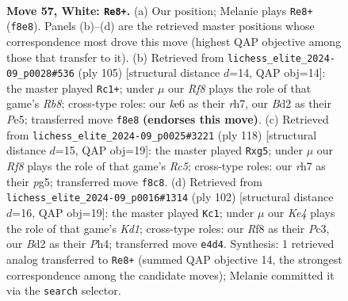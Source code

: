 \documentclass[11pt]{article}
\begin{document}
\clearpage

\begin{figure}[p]\centering
\begin{subfigure}{0.46\textwidth}\centering
\resizebox{\linewidth}{!}{%
\newchessgame
\chessboard[
  setfen={5R2/7r/3Pk3/1p6/4K3/r7/1p1B4/8 w - - 2 57},
  showmover=false,
  pgfstyle=straightmove, color=movearrow, markmove={f8-e8}
]}
\caption{}
\end{subfigure}\hfill
\begin{subfigure}{0.46\textwidth}\centering
\resizebox{\linewidth}{!}{%
\newchessgame
\chessboard[
  setfen={4k3/7R/P1K4p/4p3/8/8/7P/1r6 b - - 3 53},
  showmover=false,
  pgfstyle=straightmove, color=movearrow, markmove={b1-c1}
]}
\caption{}
\end{subfigure}
\\[4pt]
\begin{subfigure}{0.46\textwidth}\centering
\resizebox{\linewidth}{!}{%
\newchessgame
\chessboard[
  setfen={8/8/4p3/2R3p1/4k3/4P3/6K1/1r6 w - - 0 60},
  showmover=false,
  pgfstyle=straightmove, color=movearrow, markmove={c5-g5}
]}
\caption{}
\end{subfigure}\hfill
\begin{subfigure}{0.46\textwidth}\centering
\resizebox{\linewidth}{!}{%
\newchessgame
\chessboard[
  setfen={8/8/8/5p1p/2p2P1P/2P1k3/r7/3K4 w - - 0 52},
  showmover=false,
  pgfstyle=straightmove, color=movearrow, markmove={d1-c1}
]}
\caption{}
\end{subfigure}
\caption{\textbf{Move 57, White: \texttt{Re8+}.} (a) Our position; Melanie plays \texttt{Re8+} (\texttt{f8e8}). Panels (b)--(d) are the retrieved master positions whose correspondence most drove this move (highest QAP objective among those that transfer to it). (b) Retrieved from \texttt{lichess\_elite\_2024-09\_p0028\#536} (ply 105) [structural distance $d$=14, QAP obj=14]: the master played \texttt{Rc1+}; under $\mu$ our \emph{Rf8} plays the role of that game's \emph{Rb8}; cross-type roles: our \emph{k}e6 as their \emph{r}h7, our \emph{B}d2 as their \emph{P}e5; transferred move \texttt{f8e8} \textbf{(endorses this move)}. (c) Retrieved from \texttt{lichess\_elite\_2024-09\_p0025\#3221} (ply 118) [structural distance $d$=15, QAP obj=19]: the master played \texttt{Rxg5}; under $\mu$ our \emph{Rf8} plays the role of that game's \emph{Rc5}; cross-type roles: our \emph{r}h7 as their \emph{p}g5; transferred move \texttt{f8c8}. (d) Retrieved from \texttt{lichess\_elite\_2024-09\_p0016\#1314} (ply 102) [structural distance $d$=16, QAP obj=19]: the master played \texttt{Kc1}; under $\mu$ our \emph{Ke4} plays the role of that game's \emph{Kd1}; cross-type roles: our \emph{R}f8 as their \emph{P}c3, our \emph{B}d2 as their \emph{P}h4; transferred move \texttt{e4d4}. Synthesis: 1 retrieved analog transferred to \texttt{Re8+} (summed QAP objective 14, the strongest correspondence among the candidate moves); Melanie committed it via the \texttt{search} selector.}
\label{fig:thought-m112}
\end{figure}
\end{document}
